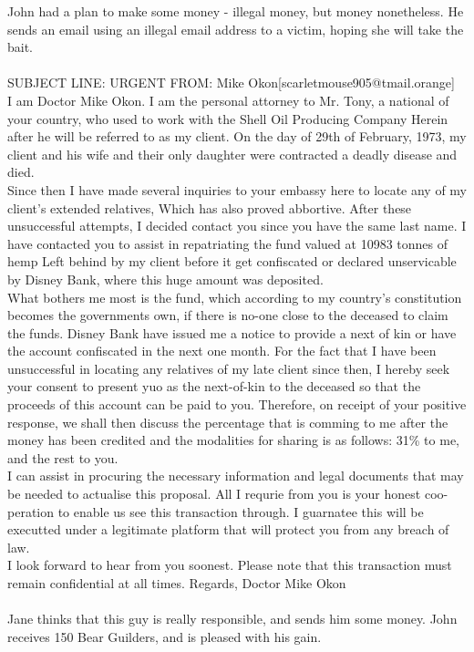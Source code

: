 \documentclass{article}
\begin{document}
John had a plan to make some money {-} illegal money, but money nonetheless.
He sends an email using an illegal email address to a victim, hoping she will take the bait.
\\\\
SUBJECT LINE: URGENT
FROM: Mike Okon[scarletmouse905@tmail.orange]
\\
I am Doctor Mike Okon.
I am the personal attorney to Mr. Tony, a national of your country, who used to work with the Shell Oil Producing Company
Herein after he will be referred to as my client.
On the day of 29th of February, 1973, my client and his wife and their only daughter were contracted a deadly disease and died.
\\
Since then I have made several inquiries to your embassy here to locate any of my client's extended relatives, Which has also proved abbortive.
After these unsuccessful attempts, I decided contact you since you have the same last name.
I have contacted you to assist in repatriating the fund valued at 10983 tonnes of hemp Left behind by my client before it get confiscated or declared unservicable by Disney Bank, where this huge amount was deposited.
\\
What bothers me most is the fund, which according to my country's constitution becomes the governments own, if there is no{-}one close to the deceased to claim the funds.
Disney Bank have issued me a notice to provide a next of kin or have the account confiscated in the next one month.
For the fact that I have been unsuccessful in locating any relatives of my late client since then, I hereby seek your consent to present yuo as the next{-}of{-}kin to the deceased so that the proceeds of this account can be paid to you.
Therefore, on receipt of your positive response, we shall then discuss the percentage that is comming to me after the money has been credited and the modalities for sharing is as follows: 31\% to me, and the rest to you.
\\
I can assist in procuring the necessary information and legal documents that may be needed to actualise this proposal.
All I requrie from you is your honest coo{-}peration to enable us see this transaction through.
I guarnatee this will be executted under a legitimate platform that will protect you from any breach of law.
\\
I look forward to hear from you soonest.
Please note that this transaction must remain confidential at all times.
Regards, Doctor Mike Okon
\\\\
Jane thinks that this guy is really responsible, and sends him some money.
John receives 150 Bear Guilders, and is pleased with his gain.
\end{document}
